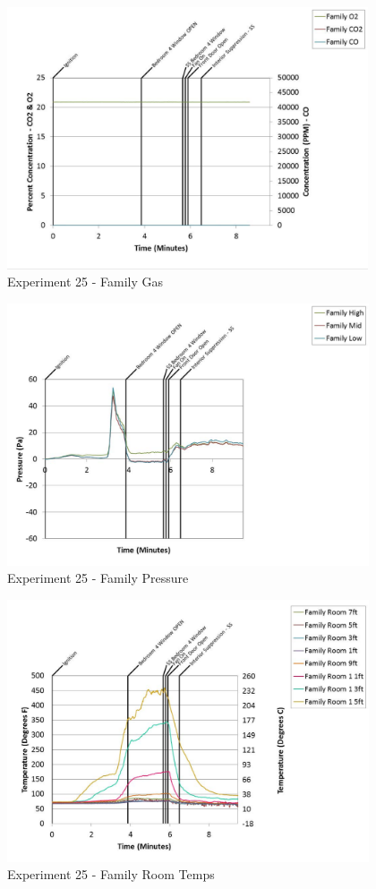 \documentclass{article}
\begin{document}
\begin{appendices}
	\begin{figure}[h!]
		\centering
		\includegraphics[height=3.05in]{0_Images/Results_Charts/Exp_25_Charts/FamilyGas.pdf}
		\caption{Experiment 25 - Family Gas}
	\end{figure}
 
	\clearpage

	\begin{figure}[h!]
		\centering
		\includegraphics[height=3.05in]{0_Images/Results_Charts/Exp_25_Charts/FamilyPressure.pdf}
		\caption{Experiment 25 - Family Pressure}
	\end{figure}
 

	\begin{figure}[h!]
		\centering
		\includegraphics[height=3.05in]{0_Images/Results_Charts/Exp_25_Charts/FamilyRoomTemps.pdf}
		\caption{Experiment 25 - Family Room Temps}
	\end{figure}
 

\end{appendices}
\end{document}

